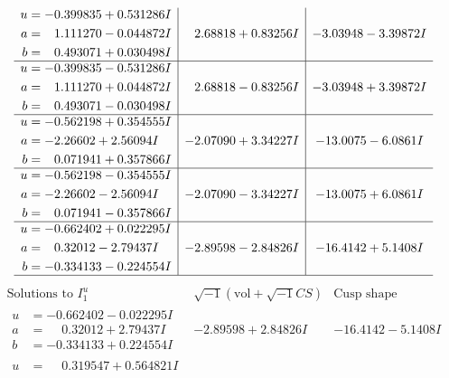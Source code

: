 \documentclass[1p]{elsarticle_modified}
\theoremstyle{definition}
\newcommand{\I}{\sqrt{-1}}
\begin{document}
$$\begin{array}{c|c|c}
\begin{aligned}
u &= -0.399835 + 0.531286 I \\
a &= \phantom{-}1.111270 - 0.044872 I \\
b &= \phantom{-}0.493071 + 0.030498 I\end{aligned}
 & \phantom{-}2.68818 + 0.83256 I & -3.03948 - 3.39872 I \\ \hline\begin{aligned}
u &= -0.399835 - 0.531286 I \\
a &= \phantom{-}1.111270 + 0.044872 I \\
b &= \phantom{-}0.493071 - 0.030498 I\end{aligned}
 & \phantom{-}2.68818 - 0.83256 I & -3.03948 + 3.39872 I \\ \hline\begin{aligned}
u &= -0.562198 + 0.354555 I \\
a &= -2.26602 + 2.56094 I \\
b &= \phantom{-}0.071941 + 0.357866 I\end{aligned}
 & -2.07090 + 3.34227 I & -13.0075 - 6.0861 I \\ \hline\begin{aligned}
u &= -0.562198 - 0.354555 I \\
a &= -2.26602 - 2.56094 I \\
b &= \phantom{-}0.071941 - 0.357866 I\end{aligned}
 & -2.07090 - 3.34227 I & -13.0075 + 6.0861 I \\ \hline\begin{aligned}
u &= -0.662402 + 0.022295 I \\
a &= \phantom{-}0.32012 - 2.79437 I \\
b &= -0.334133 - 0.224554 I\end{aligned}
 & -2.89598 - 2.84826 I & -16.4142 + 5.1408 I\\
 \hline 
 \end{array}$$\newpage$$\begin{array}{c|c|c}  
\text{Solutions to }I^u_{1}& \I (\text{vol} + \sqrt{-1}CS) & \text{Cusp shape}\\
 \hline 
\begin{aligned}
u &= -0.662402 - 0.022295 I \\
a &= \phantom{-}0.32012 + 2.79437 I \\
b &= -0.334133 + 0.224554 I\end{aligned}
 & -2.89598 + 2.84826 I & -16.4142 - 5.1408 I \\ \hline\begin{aligned}
u &= \phantom{-}0.319547 + 0.564821 I \\

\end{aligned}
\end{array}$$
\end{document}
